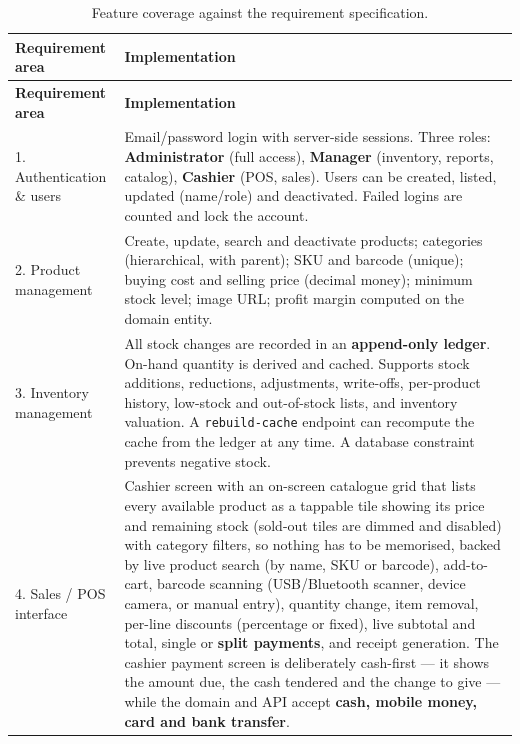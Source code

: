 \documentclass[11pt,a4paper]{article}
\begin{document}
\begin{longtable}{@{}p{}p{}@{}}
\caption{Feature coverage against the requirement specification.}\\
\toprule
\textbf{Requirement area} & \textbf{Implementation} \\
\midrule
\endfirsthead
\toprule
\textbf{Requirement area} & \textbf{Implementation} \\
\midrule
\endhead
\bottomrule
\endfoot

1. Authentication \& users &
Email/password login with server-side sessions. Three roles: \textbf{Administrator} (full access),
\textbf{Manager} (inventory, reports, catalog), \textbf{Cashier} (POS, sales). Users can be created,
listed, updated (name/role) and deactivated. Failed logins are counted and lock the account. \\[2pt]

2. Product management &
Create, update, search and deactivate products; categories (hierarchical, with parent); SKU and
barcode (unique); buying cost and selling price (decimal money); minimum stock level; image URL;
profit margin computed on the domain entity. \\[2pt]

3. Inventory management &
All stock changes are recorded in an \textbf{append-only ledger}. On-hand quantity is derived and
cached. Supports stock additions, reductions, adjustments, write-offs, per-product history,
low-stock and out-of-stock lists, and inventory valuation. A \texttt{rebuild-cache} endpoint can
recompute the cache from the ledger at any time. A database constraint prevents negative stock. \\[2pt]

4. Sales / POS interface &
Cashier screen with an on-screen catalogue grid that lists every available product as a tappable
tile showing its price and remaining stock (sold-out tiles are dimmed and disabled) with category
filters, so nothing has to be memorised, backed by live product search (by name, SKU or barcode),
add-to-cart, barcode scanning (USB/Bluetooth scanner, device camera, or manual entry), quantity
change, item removal, per-line discounts (percentage or fixed), live subtotal and total, single or
\textbf{split payments}, and receipt generation. The cashier payment screen is deliberately
cash-first --- it shows the amount due, the cash tendered and the change to give --- while the
domain and API accept \textbf{cash, mobile money, card and bank transfer}. \\[2pt]


\end{longtable}
\end{document}
